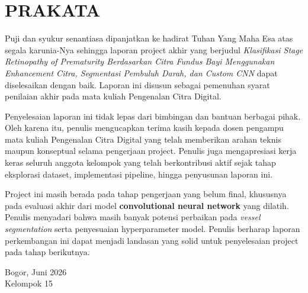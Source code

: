 
\chapter*{PRAKATA}

Puji dan syukur senantiasa dipanjatkan ke hadirat Tuhan Yang Maha Esa atas
segala karunia-Nya sehingga laporan project akhir yang berjudul
\textit{Klasifikasi Stage Retinopathy of Prematurity Berdasarkan Citra Fundus Bayi
Menggunakan Enhancement Citra, Segmentasi Pembuluh Darah, dan Custom CNN}
dapat diselesaikan dengan baik. Laporan ini disusun sebagai pemenuhan syarat
penilaian akhir pada mata kuliah Pengenalan Citra Digital.

Penyelesaian laporan ini tidak lepas dari bimbingan dan bantuan berbagai pihak.
Oleh karena itu, penulis mengucapkan terima kasih kepada dosen pengampu mata
kuliah Pengenalan Citra Digital yang telah memberikan arahan teknis maupun
konseptual selama pengerjaan project. Penulis juga mengapresiasi kerja keras
seluruh anggota kelompok yang telah berkontribusi aktif sejak tahap eksplorasi
dataset, implementasi pipeline, hingga penyusunan laporan ini.

Project ini masih berada pada tahap pengerjaan yang belum final, khususnya
pada evaluasi akhir dari model \textbf{convolutional neural network} yang dilatih.
Penulis menyadari bahwa masih banyak potensi perbaikan pada \textit{vessel segmentation}
serta penyesuaian hyperparameter model. Penulis berharap laporan perkembangan ini
dapat menjadi landasan yang solid untuk penyelesaian project pada tahap berikutnya.

\vspace{1.5cm}

\begin{flushright}
Bogor, Juni 2026\\[1.5cm]
Kelompok 15
\end{flushright}
